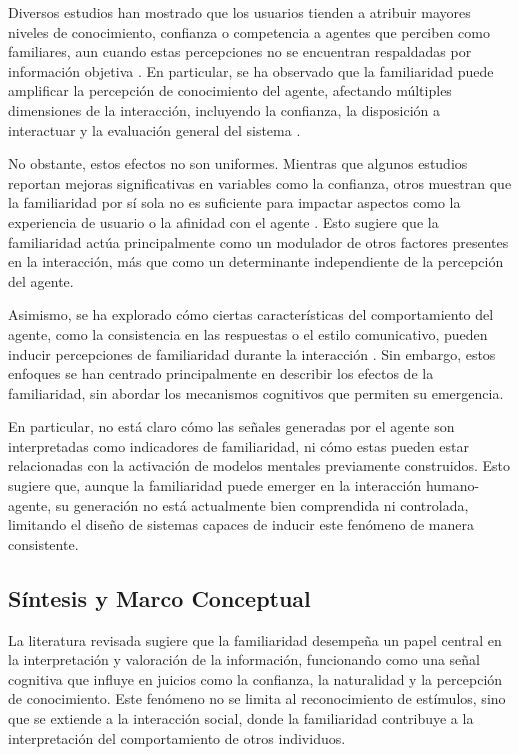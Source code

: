 \documentclass[12pt]{article}
\begin{document}
Diversos estudios han mostrado que los usuarios tienden a atribuir mayores niveles de conocimiento, confianza o competencia a agentes que perciben como familiares, aun cuando estas percepciones no se encuentran respaldadas por información objetiva \cite{poletaykina_knowing_2025, yang_exploring_2025}. En particular, se ha observado que la familiaridad puede amplificar la percepción de conocimiento del agente, afectando múltiples dimensiones de la interacción, incluyendo la confianza, la disposición a interactuar y la evaluación general del sistema \cite{yang_exploring_2025}.

No obstante, estos efectos no son uniformes. Mientras que algunos estudios reportan mejoras significativas en variables como la confianza, otros muestran que la familiaridad por sí sola no es suficiente para impactar aspectos como la experiencia de usuario o la afinidad con el agente \cite{poletaykina_knowing_2025}. Esto sugiere que la familiaridad actúa principalmente como un modulador de otros factores presentes en la interacción, más que como un determinante independiente de la percepción del agente.

Asimismo, se ha explorado cómo ciertas características del comportamiento del agente, como la consistencia en las respuestas o el estilo comunicativo, pueden inducir percepciones de familiaridad durante la interacción \cite{yang_exploring_2025}. Sin embargo, estos enfoques se han centrado principalmente en describir los efectos de la familiaridad, sin abordar los mecanismos cognitivos que permiten su emergencia.

En particular, no está claro cómo las señales generadas por el agente son interpretadas como indicadores de familiaridad, ni cómo estas pueden estar relacionadas con la activación de modelos mentales previamente construidos. Esto sugiere que, aunque la familiaridad puede emerger en la interacción humano-agente, su generación no está actualmente bien comprendida ni controlada, limitando el diseño de sistemas capaces de inducir este fenómeno de manera consistente.


\subsection{Síntesis y Marco Conceptual}

La literatura revisada sugiere que la familiaridad desempeña un papel central en la interpretación y valoración de la información, funcionando como una señal cognitiva que influye en juicios como la confianza, la naturalidad y la percepción de conocimiento. Este fenómeno no se limita al reconocimiento de estímulos, sino que se extiende a la interacción social, donde la familiaridad contribuye a la interpretación del comportamiento de otros individuos.
\end{document}
